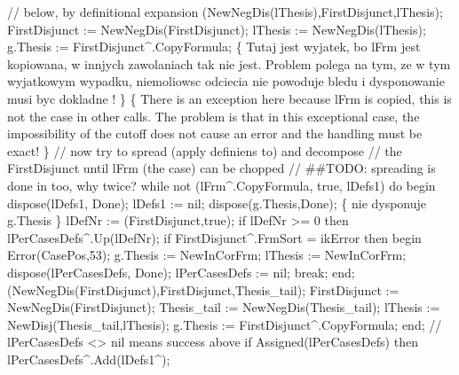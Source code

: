                // below, by definitional expansion
               (NewNegDis(lThesis),FirstDisjunct,lThesis);
               FirstDisjunct := NewNegDis(FirstDisjunct);
               lThesis := NewNegDis(lThesis);
               g.Thesis := FirstDisjunct^.CopyFormula;
               \{ Tutaj jest wyjatek, bo lFrm jest kopiowana, w innjych zawolaniach
                  tak nie jest.
                 Problem polega na tym, ze w tym wyjatkowym wypadku,
                 niemoliowsc odciecia nie powoduje bledu i dysponowanie musi byc
                 dokladne !
               \}
               \{ There is an exception here because lFrm is copied,
                 this is not the case in other  calls.
                 The problem is that in this exceptional case,
                 the impossibility of the cutoff does not cause an error
                 and the handling must be exact!
                \}
               // now try to spread (apply definiens to) and decompose
               // the FirstDisjunct until lFrm (the case) can be chopped
               // ##TODO: spreading is done in  too, why twice?
               while not (lFrm^.CopyFormula, true, lDefs1) do
               begin
                  dispose(lDefs1, Done); lDefs1 := nil;
                  dispose(g.Thesis,Done);
                  \{  nie dysponuje g.Thesis \}
                  lDefNr := (FirstDisjunct,true);
                  if lDefNr >= 0 then lPerCasesDefs^.Up(lDefNr);
                  if FirstDisjunct^.FrmSort = ikError then
                  begin
                     Error(CasePos,53);
                     g.Thesis := NewInCorFrm;
                     lThesis := NewInCorFrm;
                     dispose(lPerCasesDefs, Done);
                     lPerCasesDefs := nil;
                     break;
                  end;
                  (NewNegDis(FirstDisjunct),FirstDisjunct,Thesis_tail);
                  FirstDisjunct := NewNegDis(FirstDisjunct);
                  Thesis_tail := NewNegDis(Thesis_tail);
                  lThesis := NewDisj(Thesis_tail,lThesis);
                  g.Thesis := FirstDisjunct^.CopyFormula;
               end;
               // lPerCasesDefs <> nil means success above
               if Assigned(lPerCasesDefs) then lPerCasesDefs^.Add(lDefs1^);
